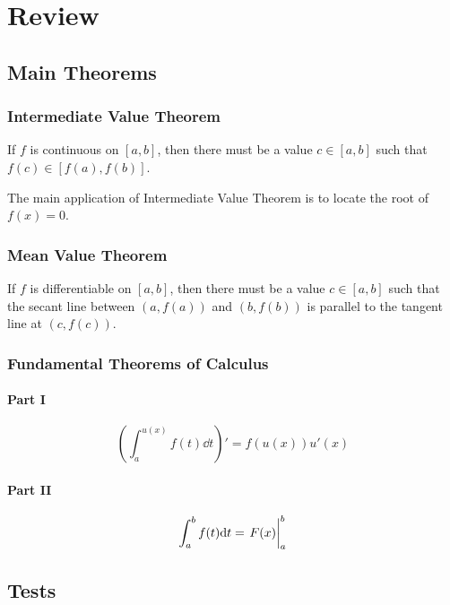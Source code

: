 \documentclass{note}
\begin{document}
\chapter{Review}

\section{Main Theorems}

\subsection{Intermediate Value Theorem}

If $f$ is continuous on $[a, b]$, then there must be a value $c \in [a, b]$ such that $f(c) \in [f(a), f(b)]$.

The main application of Intermediate Value Theorem is to locate the root of $f(x) = 0$.

\subsection{Mean Value Theorem}

If $f$ is differentiable on $[a, b]$, then there must be a value $c \in [a, b]$ such that the secant line between $(a, f(a))$ and $(b, f(b))$ is parallel to the tangent line at $(c, f(c))$.

\subsection{Fundamental Theorems of Calculus}

\subsubsection{Part I}

\begin{equation*}
    \left(\int_{a}^{u(x)} f(t) \dd{t}\right)' = f(u(x)) u'(x) 
\end{equation*}

\subsubsection{Part II}

\begin{equation*}
    \int_a^b f(t) \dd t = \eval{F(x)}_a^b
\end{equation*}

\section{Tests}
\end{document}
